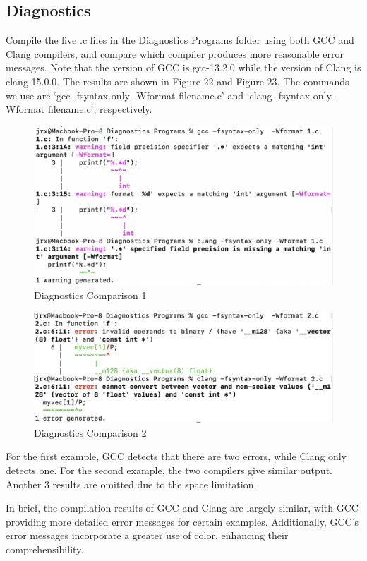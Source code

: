 \documentclass[conference]{IEEEtran}
\begin{document}
\subsection{Diagnostics}

Compile the five .c files\cite{b15} in the Diagnostics Programs folder using both GCC and Clang compilers, and compare which compiler produces more reasonable error messages. Note that the version of GCC is gcc-13.2.0 while the version of Clang is clang-15.0.0. The results are shown in Figure 22 and Figure 23. The commands we use are `gcc -fsyntax-only -Wformat filename.c' and `clang -fsyntax-only -Wformat filename.c', respectively.

\begin{figure}[htbp]
\centering
\includegraphics [width=0.8\linewidth]{DiagnosticsPrograms/1.png}
\caption{Diagnostics Comparison 1}
\label{fig22}
\end{figure}

\begin{figure}[htbp]
\centering
\includegraphics [width=0.8\linewidth]{DiagnosticsPrograms/2.png}
\caption{Diagnostics Comparison 2}
\label{fig23}
\end{figure}

For the first example, GCC detects that there are two errors, while Clang only detects one. For the second example, the two compilers give similar output. Another 3 results are omitted due to the space limitation.

In brief, the compilation results of GCC and Clang are largely similar, with GCC providing more detailed error messages for certain examples. Additionally, GCC's error messages incorporate a greater use of color, enhancing their comprehensibility.
\end{document}
